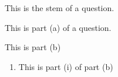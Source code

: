 
\begin{question}
    This is the stem of a question.

    \begin{questionparts}
        \item This is part (a) of a question.
        \item This is part (b) 
        \begin{enumerate}
            \item This is part (i) of part (b)
        \end{enumerate}
    \end{questionparts}

\end{question}



